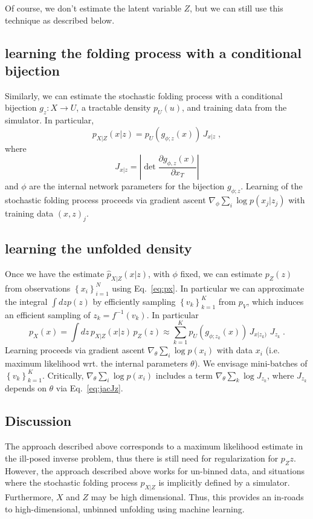 \documentclass[a4paper]{article}
\begin{document}
Of course, we don't estimate the latent variable $Z$, but we can still use this technique as described below.


\subsection{learning the folding process with a conditional bijection}

Similarly, we can estimate the stochastic folding process  with a conditional bijection $g_{z}:X\to U$, a tractable density $p_U(u)$, and training data from the simulator. In particular,
\begin{equation}
p_{X|Z}(x|z) =  p_{U}(g_{\phi;z}(x))\, J_{x|z} \;,
\end{equation}
where
\begin{equation}
J_{x|z} =  \left| \det \frac{\partial g_{\phi,z}({x})}{\partial {x}_T} \right|
\end{equation}
and $\phi$ are the internal network parameters for the bijection $g_{\phi; z}$. Learning of the stochastic folding process proceeds via gradient ascent $\nabla_\phi \sum_i \log p(x_j|z_j)$ with training data $(x,z)_j$. 



\subsection{learning the unfolded density}


Once we have the estimate $\hat{p}_{X|Z}(x|z)$, with $\phi$ fixed, we can estimate $p_{Z}(z)$ from observations $\left\{ x_i \right\}_{i=1}^{N}$ using Eq.~\ref{eq:px}. In particular we can approximate the integral $\int dz p(z)$ by efficiently sampling $\left \{ v_k \right \}_{k=1}^{K}$ from $p_V$, which induces an efficient sampling of $z_k = f^{-1}(v_k)$.  
In particular 
\begin{equation}\label{eq:px}
p_{X}(x) = \int dz \, p_{X|Z}(x|z)\, p_{Z}(z) \approx \sum_{k=1}^K p_{U}(g_{\phi;z_k}(x))\, J_{x|z_k)} \, \, J_{z_k}\; .
\end{equation}
Learning proceeds via gradient ascent $\nabla_\theta \sum_i \log p(x_i)$ with data $x_i$  (i.e. maximum likelihood wrt. the internal parameters $\theta$). We envisage mini-batches of $\left \{ v_k \right \}_{k=1}^{K}$. Critically, $\nabla_\theta \sum_i \log p(x_i)$ includes a term $\nabla_\theta \sum_k \log J_{z_k}$, where $J_{z_k}$ depends on $\theta$ via Eq.~\ref{eq:jacJz}.

\subsection{Discussion}

The approach described above corresponds to a maximum likelihood estimate in the ill-posed inverse problem, thus there is still need for regularization for $p_Z{z}$. However, the approach described above works for un-binned data, and situations where the stochastic folding process $p_{X|Z}$ is implicitly defined by a simulator. Furthermore, $X$ and $Z$ may be high dimensional. Thus, this provides an in-roads to high-dimensional, unbinned unfolding using machine learning.





\end{document}
